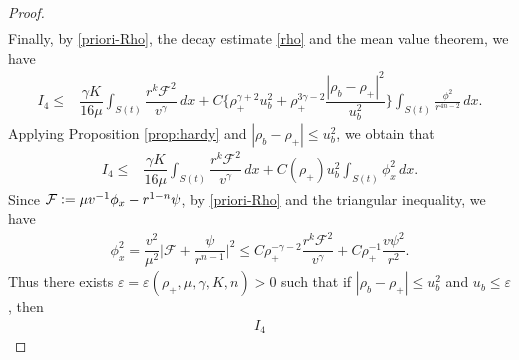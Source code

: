 \documentclass[a4paper,12pt,draft]{article}
\theoremstyle{remark}
\def\vt{\tilde{v}}
\def\ep{\varepsilon}
\def\mF{\mathcal{F}}
\begin{document}
\begin{proof}
\begin{align*}
    \end{align*}
    Finally, by \eqref{priori-Rho}, the decay estimate \eqref{rho} and the mean value theorem, we have
    \begin{align*}
        I_4 %
        \le& \dfrac{\gamma K}{16 \mu} \int_{S(t)}\!\! \dfrac{r^{k}\mF^2}{v^{\gamma}}\, dx + C\Big\{ \rho_{+}^{\gamma+2} u_b^2 + \rho_{+}^{3\gamma-2}\dfrac{|\rho_b-\rho_+|^2}{u_b^2} \Big\} \int_{S(t)}   \frac{\phi^2}{r^{4n-2}}\, dx.
    \end{align*}
    Applying Proposition \ref{prop:hardy} and $|\rho_b-\rho_{+}| \le u_b^2$, we obtain that 
    \begin{align*}
        I_4 %
        \le& \dfrac{\gamma K}{16 \mu} \int_{S(t)}\!\! \dfrac{r^{k}\mF^2}{v^{\gamma}}\, dx + C(\rho_{+}) u_b^2\int_{S(t)} \phi_x^2\, dx.
    \end{align*}
    Since $\mF\vcentcolon= \mu v^{-1}\phi_x - r^{1-n}\psi$, by \eqref{priori-Rho} and the triangular inequality, we have
    \begin{align*}
        \phi_x^2= \dfrac{v^2}{\mu^2} \Big| \mF + \dfrac{\psi}{r^{n-1}} \Big|^2 \le C \rho_{+}^{-\gamma-2} \dfrac{r^k \mF^2}{v^{\gamma}} + C \rho_{+}^{-1} \dfrac{v\psi^2}{r^2}. 
    \end{align*}
    Thus there exists $\ep=\ep(\rho_{+},\mu,\gamma,K,n)>0$ such that if $|\rho_b-\rho_+|\le u_b^{2}$ and $u_b\le \ep$, then
    \begin{align*}
        I_4 %

\end{align*}
\end{proof}
\end{document}
